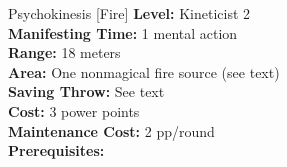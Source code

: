 {Psychokinesis [Fire]}
{
	\textbf{Level:}
	Kineticist 2\\
	\textbf{Manifesting Time:}
	1 mental action\\
	\textbf{Range:}
	18 meters\\
	\textbf{Area:}
	One nonmagical fire source (see text)\\
	\textbf{Saving Throw:}
	See text\\
	\textbf{Cost:}
	3 power points\\
	\textbf{Maintenance Cost:}
	2 pp/round\\
	\textbf{Prerequisites:}
	\\
}
